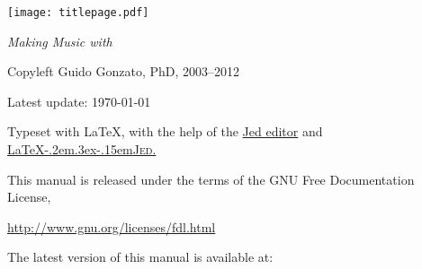\documentclass[a4paper,fullpage,12pt]{book}
\begin{document}
\frontmatter

\setcounter{tocdepth}{3}
\thispagestyle{empty}


\begin{titlepage}

  \setcounter{page}{0}

  \pagecolor{shadecolor}
  \thisfancypage{
  \Ovalbox}{}
  \centering

  {
    \null %
    \vspace{0.5cm}


    \vspace{6cm}


    \bigskip

    \resizebox{!}{1.35cm}{\ABCPLUS{}}

    \vspace{4cm}

    \setlength{\fboxsep}{1cm}
    {\texttt{[image: titlepage.pdf]}}

    \vfill

  
    \vspace{1cm}

  }

\end{titlepage}


\thispagestyle{empty}
\pagecolor{white}
\null
\vfill

\textit{Making Music with \ABCPLUS}

Copyleft \textcopyright{} Guido Gonzato, PhD, 2003--2012

Latest update: \today

Typeset with \LaTeX, with the help of the
\href{http://www.jedsoft.org/jed/}{Jed editor} and
\href{http://www.ctan.org/pkg/latex4jed}{
{\LaTeX\kern-.2em\raise.3ex\hbox{}\kern-.15em\textsc{Jed.}}
}

This manual is released under the terms of the GNU Free Documentation
License,

\url{http://www.gnu.org/licenses/fdl.html}

\bigskip

The latest version of this manual is available at:
\end{document}

